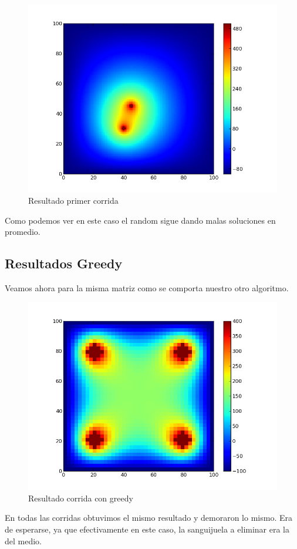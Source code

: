 \newpage

\begin{figure}[htb]
\begin{center}
\includegraphics[scale=0.40]{imagenes/random_6.png} 
\caption{Resultado primer corrida} 
\end{center}
\end{figure}

Como podemos ver en este caso el random sigue dando malas soluciones en promedio. 


\subsection{Resultados Greedy}

Veamos ahora para la misma matriz como se comporta nuestro otro algoritmo. 


\begin{figure}[htb]
\begin{center}
\includegraphics[scale=0.50]{imagenes/random_2.png} 
\caption{Resultado corrida con greedy} 
\end{center}
\end{figure}
\newpage

En todas las corridas obtuvimos el mismo resultado y demoraron lo mismo. Era de esperarse, ya que efectivamente en este caso, la sanguijuela a eliminar era la del medio.